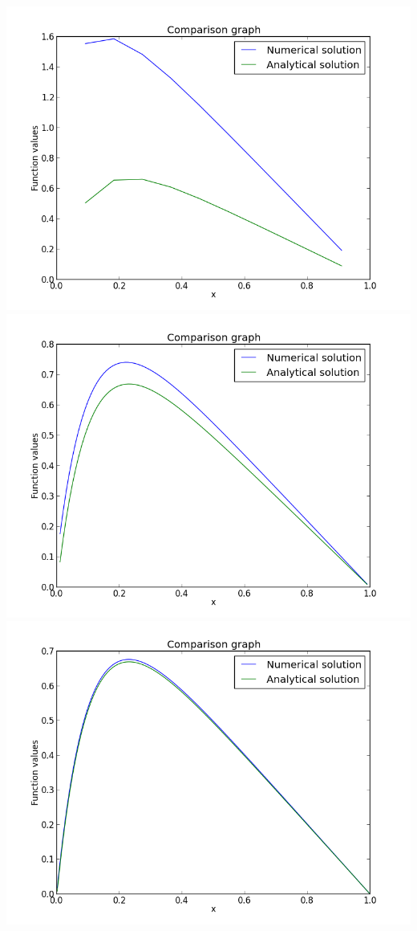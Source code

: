 \documentclass{article}
\begin{document}
\begin{enumerate}
\hspace{-0.4cm}\includegraphics[scale=0.3]{P10x.png}\hspace{0.1cm} \includegraphics[scale=0.3]{P100x.png}\\
\includegraphics[scale=0.4]{P1000x.png}\\
 

\end{enumerate}
\end{document}
